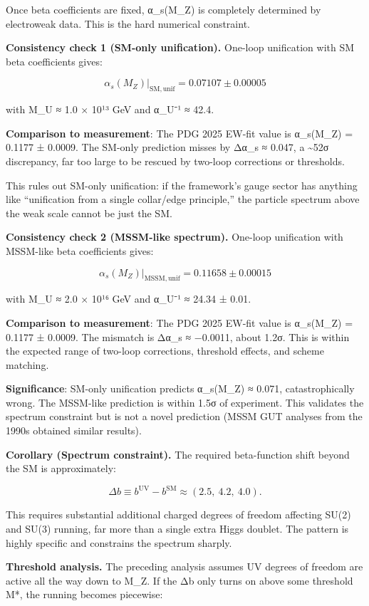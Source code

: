 \documentclass[
]{article}
\begin{document}
Once beta coefficients are fixed, α\_s(M\_Z) is completely determined by
electroweak data. This is the hard numerical constraint.

\textbf{Consistency check 1 (SM-only unification).} One-loop unification
with SM beta coefficients gives:

\[
\alpha_s(M_Z)|_\mathrm{SM,unif} = 0.07107 \pm 0.00005
\]

with M\_U ≈ 1.0 × 10¹³ GeV and α\_U⁻¹ ≈ 42.4.

\textbf{Comparison to measurement}: The PDG 2025 EW-fit value is
α\_s(M\_Z) = 0.1177 ± 0.0009. The SM-only prediction misses by Δα\_s ≈
0.047, a \textasciitilde52σ discrepancy, far too large to be rescued by
two-loop corrections or thresholds.

This rules out SM-only unification: if the framework's gauge sector has
anything like ``unification from a single collar/edge principle,'' the
particle spectrum above the weak scale cannot be just the SM.

\textbf{Consistency check 2 (MSSM-like spectrum).} One-loop unification
with MSSM-like beta coefficients gives:

\[
\alpha_s(M_Z)|_\mathrm{MSSM,unif} = 0.11658 \pm 0.00015
\]

with M\_U ≈ 2.0 × 10¹⁶ GeV and α\_U⁻¹ ≈ 24.34 ± 0.01.

\textbf{Comparison to measurement}: The PDG 2025 EW-fit value is
α\_s(M\_Z) = 0.1177 ± 0.0009. The mismatch is Δα\_s ≈ −0.0011, about
1.2σ. This is within the expected range of two-loop corrections,
threshold effects, and scheme matching.

\textbf{Significance}: SM-only unification predicts α\_s(M\_Z) ≈ 0.071,
catastrophically wrong. The MSSM-like prediction is within 1.5σ of
experiment. This validates the spectrum constraint but is not a novel
prediction (MSSM GUT analyses from the 1990s obtained similar results).

\textbf{Corollary (Spectrum constraint).} The required beta-function
shift beyond the SM is approximately:

\[
\Delta b \equiv b^{\mathrm{UV}} - b^{\mathrm{SM}} \approx (2.5,\ 4.2,\ 4.0).
\]

This requires substantial additional charged degrees of freedom
affecting SU(2) and SU(3) running, far more than a single extra Higgs
doublet. The pattern is highly specific and constrains the spectrum
sharply.

\textbf{Threshold analysis.} The preceding analysis assumes UV degrees
of freedom are active all the way down to M\_Z. If the Δb only turns on
above some threshold M*, the running becomes piecewise:
\end{document}
